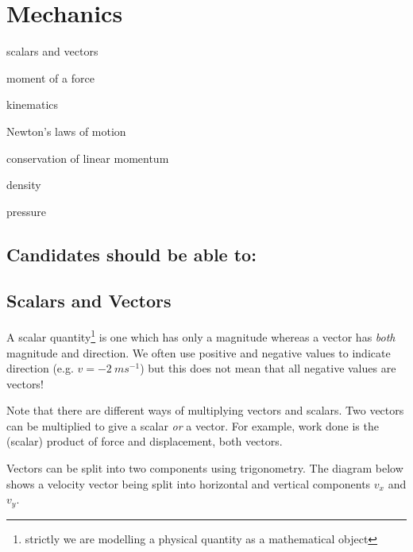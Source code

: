 \documentclass[revision-guide.tex]{subfiles}
\begin{document}
\chapter{Mechanics}
\begin{content}
\item scalars and vectors
\item moment of a force
\item kinematics
\item Newton’s laws of motion
\item conservation of linear momentum
\item density
\item pressure
\end{content}

\section*{Candidates should be able to:}

\section{Scalars and Vectors}
A scalar quantity\footnote{strictly we are modelling a physical quantity as a mathematical object} is one which has only a magnitude whereas a vector has \emph{both} magnitude and direction. We often use positive and negative values to indicate direction (e.g. $v=-2\ ms^{-1}$) but this does not mean that all negative values are vectors!

Note that there are different ways of multiplying vectors and scalars. Two vectors can be multiplied to give a scalar \emph{or} a vector. For example, work done is the (scalar) product of force and displacement, both vectors.


Vectors can be split into two components using trigonometry. The diagram below shows a velocity vector being split into horizontal and vertical components $v_x$ and $v_y$.

\begin{figure}[h]
\begin{center}
\end{center}
\end{figure}
\end{document}
